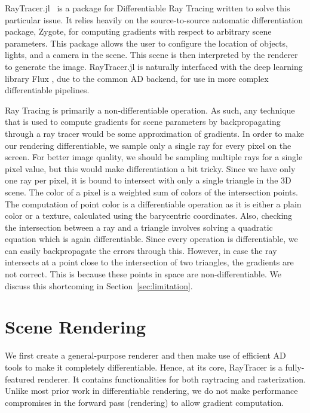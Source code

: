 \documentclass{juliacon}
\begin{document}
RayTracer.jl~\cite{RayTracer.jl} is a package for Differentiable Ray Tracing written to solve this particular issue. It relies heavily on the source-to-source automatic differentiation package, Zygote, for computing gradients with respect to arbitrary scene parameters. This package allows the user to configure the location of objects, lights, and a camera in the scene. This scene is then interpreted by the renderer to generate the image. RayTracer.jl is naturally interfaced with the deep learning library Flux \cite{Flux.jl-2018}, due to the common AD backend, for use in more complex differentiable pipelines.

Ray Tracing is primarily a non-differentiable operation. As such, any technique that is used to compute gradients for scene parameters by backpropagating through a ray tracer would be some approximation of gradients. In order to make our rendering differentiable, we sample only a single ray for every pixel on the screen. For better image quality, we should be sampling multiple rays for a single pixel value, but this would make differentiation a bit tricky. Since we have only one ray per pixel, it is bound to intersect with only a single triangle in the 3D scene. The color of a pixel is a weighted sum of colors of the intersection points. The computation of point color is a differentiable operation as it is either a plain color or a texture, calculated using the barycentric coordinates. Also, checking the intersection between a ray and a triangle involves solving a quadratic equation which is again differentiable. Since every operation is differentiable, we can easily backpropagate the errors through this. However, in case the ray intersects at a point close to the intersection of two triangles, the gradients are not correct. This is because these points in space are non-differentiable. We discuss this shortcoming in Section~\ref{sec:limitation}.

\section{Scene Rendering}

We first create a general-purpose renderer and then make use of efficient AD tools to make it completely differentiable. Hence, at its core, RayTracer is a fully-featured renderer. It contains functionalities for both raytracing and rasterization. Unlike most prior work in differentiable rendering, we do not make performance compromises in the forward pass (rendering) to allow gradient computation.
\end{document}
